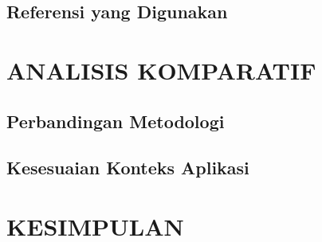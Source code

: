\documentclass[10pt,a4paper]{article}
\begin{document}
\subsection{Referensi yang Digunakan}


\section{ANALISIS KOMPARATIF}

\subsection{Perbandingan Metodologi}


\subsection{Kesesuaian Konteks Aplikasi}


\section{KESIMPULAN}




\end{document}
